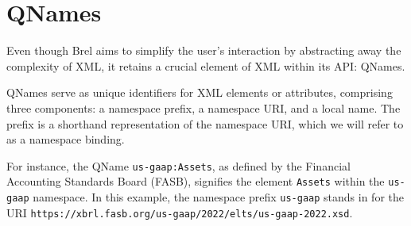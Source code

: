 \section{QNames}
\label{sec:qnames}





Even though Brel aims to simplify the user's interaction by abstracting away the complexity of XML,
it retains a crucial element of XML within its API: QNames.

QNames serve as unique identifiers for XML elements or attributes,
comprising three components: a namespace prefix, a namespace URI, and a local name.
The prefix is a shorthand representation of the namespace URI, which we will refer to as a namespace binding.

For instance, the QName \texttt{us-gaap:Assets}, as defined by the Financial Accounting Standards Board (FASB)\cite{fasb},
signifies the element \texttt{Assets} within the \texttt{us-gaap} namespace.
In this example, the namespace prefix \texttt{us-gaap} stands in for the URI \texttt{https://xbrl.fasb.org/us-gaap/2022/elts/us-gaap-2022.xsd}\cite{fasb}.


